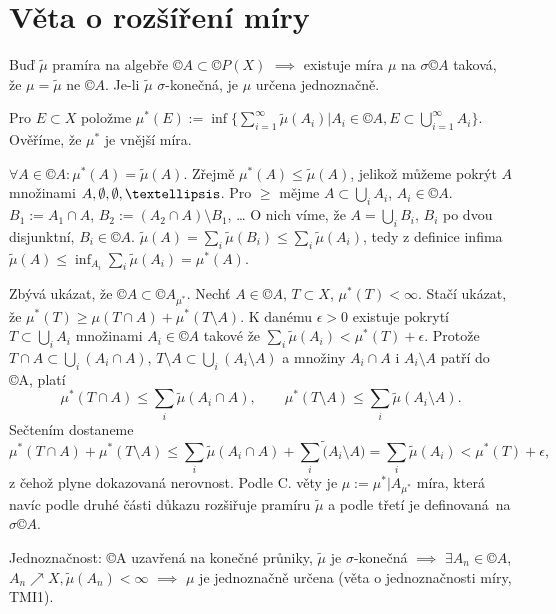 \documentclass[12pt]{article}					%
\begin{document}
\section{Věta o rozšíření míry}
\begin{veta}
	Buď $\tilde{\mu}$ pramíra na algebře $©A \subset ©P(X)$ $\implies$ existuje míra $\mu$ na $\sigma©A$ taková, že $\mu = \tilde{\mu}$ ne $©A$. Je-li $\tilde{\mu}$ $\sigma$-konečná, je $\mu$ určena jednoznačně.

	\begin{dukazin}
		Pro $E \subset X$ položme $\mu^*(E) := \inf\{\sum_{i=1}^∞ \tilde{\mu}(A_i) | A_i \in ©A, E \subset \bigcup_{i=1}^∞A_i\}$. Ověříme, že $\mu^*$ je vnější míra.

		$\forall A \in ©A: \mu^*(A) = \tilde{\mu}(A)$. Zřejmě $\mu^*(A) ≤ \tilde{\mu}(A)$, jelikož můžeme pokrýt $A$ množinami $A, \O, \O, …$. Pro $≥$ mějme $A \subset \bigcup_i A_i$, $A_i \in ©A$. $B_1:= A_1 \cap A$, $B_2 := (A_2 \cap A) \setminus B_1$, … O nich víme, že $A = \bigcup_i B_i$, $B_i$ po dvou disjunktní, $B_i \in ©A$. $\tilde{\mu}(A) = \sum_i\tilde{\mu}(B_i) ≤ \sum_i\tilde{\mu}(A_i)$, tedy z definice infima $\tilde{\mu}(A) ≤ \inf_{A_i}\sum_i \tilde{\mu}(A_i) = \mu^*(A)$.

		Zbývá ukázat, že $©A \subset ©A_{\mu^*}$. Nechť $A \in ©A$, $T \subset X$, $\mu^*(T) < ∞$. Stačí ukázat, že $\mu^*(T) ≥ \mu(T \cap A) + \mu^*(T \setminus A)$. K danému $\epsilon > 0$ existuje pokrytí $T \subset \bigcup_i A_i$ množinami $A_i \in ©A$ takové že $\sum_i \tilde \mu(A_i) < \mu^*(T) + \epsilon$. Protože $T \cap A \subset \bigcup_i(A_i \cap A)$, $T \setminus A \subset \bigcup_i(A_i \setminus A)$ a množiny $A_i \cap A$ i $A_i \setminus A$ patří do ©A, platí
		$$ \mu^*(T \cap A) ≤ \sum_i \tilde \mu(A_i \cap A), \qquad \mu^*(T \setminus A) ≤ \sum_i \tilde \mu(A_i \setminus A). $$
		Sečtením dostaneme
		$$ \mu^*(T \cap A) + \mu^*(T \setminus A) ≤ \sum_i \tilde \mu(A_i \cap A) + \sum_i \tilde (A_i \setminus A) = \sum_i \tilde \mu(A_i) < \mu^*(T) + \epsilon, $$
		z čehož plyne dokazovaná nerovnost. Podle C. věty je $\mu := \mu^*|A_{\mu^*}$ míra, která navíc podle druhé části důkazu rozšiřuje pramíru $\tilde \mu$ a podle třetí je definovaná na $\sigma ©A$.

		Jednoznačnost: ©A uzavřená na konečné průniky, $\tilde{\mu}$ je $\sigma$-konečná $\implies$ $\exists A_n \in ©A$, $A_n \nearrow X, \tilde{\mu}(A_n) < ∞$ $\implies$ $\mu$ je jednoznačně určena (věta o jednoznačnosti míry, TMI1).
	\end{dukazin}
\end{veta}
\end{document}
